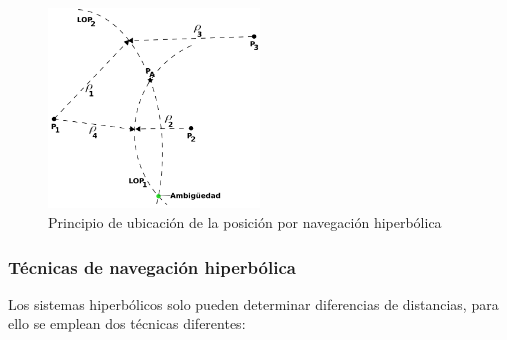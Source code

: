 \begin{figure}[!h]
  \centering
  \includegraphics[width=0.5\textwidth]{Imagenes/06.01.adf/hiperbolic-fix.png}
  \caption{Principio de ubicaci\'on de la posici\'on por navegaci\'on hiperb\'olica}
  \label{fig:principio.navegacion.hiperbolica}
\end{figure}


\subsubsection{T\'ecnicas de navegaci\'on hiperb\'olica}

Los sistemas hiperb\'olicos solo pueden determinar diferencias de distancias, para ello se emplean dos t\'ecnicas diferentes:

